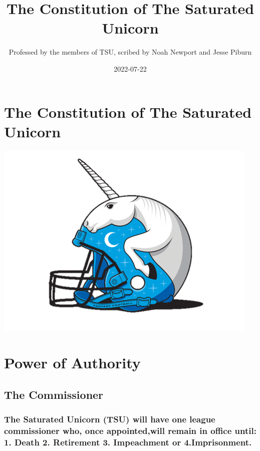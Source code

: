 \documentclass[
]{book}
\title{The Constitution of The Saturated Unicorn}
\author{Professed by the members of TSU, scribed by Noah Newport and Jesse Piburn}
\date{2022-07-22}
\begin{document}
\maketitle

{
\setcounter{tocdepth}{1}
\tableofcontents
}
\hypertarget{the-constitution-of-the-saturated-unicorn}{%
\chapter*{The Constitution of The Saturated Unicorn}\label{the-constitution-of-the-saturated-unicorn}}

\includegraphics[width=0.9\linewidth]{images/tsu-logo}

\hypertarget{power-of-authority}{%
\chapter{Power of Authority}\label{power-of-authority}}

\hypertarget{the-commissioner}{%
\section{The Commissioner}\label{the-commissioner}}

\hypertarget{the-saturated-unicorn-tsu-will-have-one-league-commissioner-who-once-appointedwill-remain-in-office-until-1.-death-2.-retirement-3.-impeachment-or-4.imprisonment.}{%
\subsection{The Saturated Unicorn (TSU) will have one league commissioner who, once appointed,will remain in office until: 1. Death 2. Retirement 3. Impeachment or 4.Imprisonment.}\label{the-saturated-unicorn-tsu-will-have-one-league-commissioner-who-once-appointedwill-remain-in-office-until-1.-death-2.-retirement-3.-impeachment-or-4.imprisonment.}}
\end{document}
